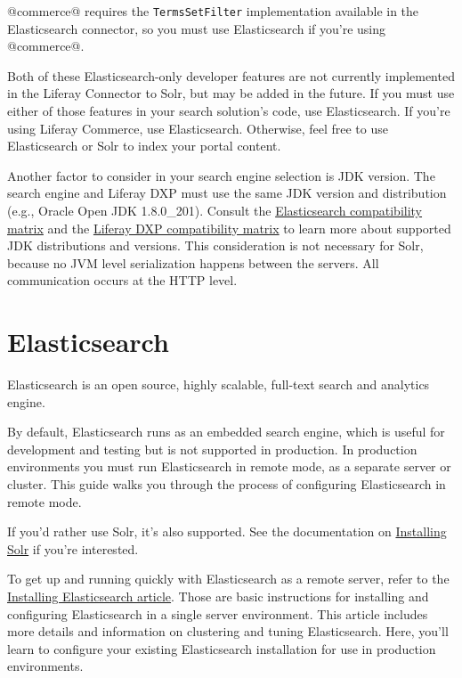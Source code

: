 @commerce@ requires the \texttt{TermsSetFilter} implementation available
in the Elasticsearch connector, so you must use Elasticsearch if you're
using @commerce@.

Both of these Elasticsearch-only developer features are not currently
implemented in the Liferay Connector to Solr, but may be added in the
future. If you must use either of those features in your search
solution's code, use Elasticsearch. If you're using Liferay Commerce,
use Elasticsearch. Otherwise, feel free to use Elasticsearch or Solr to
index your portal content.

Another factor to consider in your search engine selection is JDK
version. The search engine and Liferay DXP must use the same JDK version
and distribution (e.g., Oracle Open JDK 1.8.0\_201). Consult the
\href{https://www.elastic.co/support/matrix\#matrix_jvm}{Elasticsearch
compatibility matrix} and the
\href{https://help.liferay.com/hc/en-us/articles/360016285432-Liferay-DXP-7-1-Compatibility-Matrix}{Liferay
DXP compatibility matrix} to learn more about supported JDK
distributions and versions. This consideration is not necessary for
Solr, because no JVM level serialization happens between the servers.
All communication occurs at the HTTP level.

\chapter{Elasticsearch}\label{elasticsearch}

Elasticsearch is an open source, highly scalable, full-text search and
analytics engine.

By default, Elasticsearch runs as an embedded search engine, which is
useful for development and testing but is not supported in production.
In production environments you must run Elasticsearch in remote mode, as
a separate server or cluster. This guide walks you through the process
of configuring Elasticsearch in remote mode.

If you'd rather use Solr, it's also supported. See the documentation on
\href{discover/deployment/-/knowledge_base/7-1/installing-solr}{Installing
Solr} if you're interested.

To get up and running quickly with Elasticsearch as a remote server,
refer to the
\href{/docs/7-1/deploy/-/knowledge_base/d/installing-elasticsearch}{Installing
Elasticsearch article}. Those are basic instructions for installing and
configuring Elasticsearch in a single server environment. This article
includes more details and information on clustering and tuning
Elasticsearch. Here, you'll learn to configure your existing
Elasticsearch installation for use in production environments.

